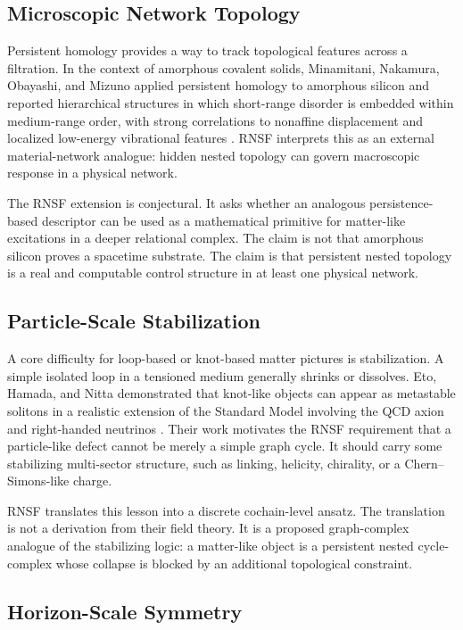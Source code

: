 \documentclass[11pt]{article}
\begin{document}
\subsection{Microscopic Network Topology}

Persistent homology provides a way to track topological features across a filtration. In the context of amorphous covalent solids, Minamitani, Nakamura, Obayashi, and Mizuno applied persistent homology to amorphous silicon and reported hierarchical structures in which short-range disorder is embedded within medium-range order, with strong correlations to nonaffine displacement and localized low-energy vibrational features \cite{Minamitani2025}. RNSF interprets this as an external material-network analogue: hidden nested topology can govern macroscopic response in a physical network.

The RNSF extension is conjectural. It asks whether an analogous persistence-based descriptor can be used as a mathematical primitive for matter-like excitations in a deeper relational complex. The claim is not that amorphous silicon proves a spacetime substrate. The claim is that persistent nested topology is a real and computable control structure in at least one physical network.

\subsection{Particle-Scale Stabilization}

A core difficulty for loop-based or knot-based matter pictures is stabilization. A simple isolated loop in a tensioned medium generally shrinks or dissolves. Eto, Hamada, and Nitta demonstrated that knot-like objects can appear as metastable solitons in a realistic extension of the Standard Model involving the QCD axion and right-handed neutrinos \cite{Eto2025}. Their work motivates the RNSF requirement that a particle-like defect cannot be merely a simple graph cycle. It should carry some stabilizing multi-sector structure, such as linking, helicity, chirality, or a Chern--Simons-like charge.

RNSF translates this lesson into a discrete cochain-level ansatz. The translation is not a derivation from their field theory. It is a proposed graph-complex analogue of the stabilizing logic: a matter-like object is a persistent nested cycle-complex whose collapse is blocked by an additional topological constraint.

\subsection{Horizon-Scale Symmetry}
\end{document}
